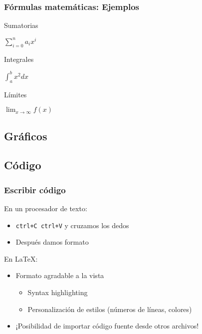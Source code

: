 \documentclass[svgnames]{beamer}
\begin{document}
\begin{frame}
  \frametitle{Fórmulas matemáticas: Ejemplos}
  Sumatorias
  {}
  \begin{center}
    $\sum_{i=0}^{n} a_ix^i$   
  \end{center}\pause
  Integrales
  {}
  \begin{center}
    $\int_{a}^{b} x^2 dx$   
  \end{center}\pause
  Límites
  {}
  \begin{center}
    $\lim_{x\to\infty} f(x)$  
  \end{center}\pause

\end{frame}

\subsection{Gráficos}

\begin{frame}
  \frametitle{}
\end{frame}


\subsection{Código}

\begin{frame}
  \frametitle{Escribir código}
  En un procesador de texto: 
  \begin{itemize}
    \item \texttt{ctrl+C ctrl+V} y cruzamos los dedos
    \item Después damos formato
  \end{itemize}\pause
  En \LaTeX:
  \begin{itemize}
    \item Formato agradable a la vista
    \begin{itemize}
      \item Syntax highlighting
      \item Personalización de estilos (números de líneas, colores)
    \end{itemize}
    \item ¡Posibilidad de importar código fuente desde otros archivos!
  \end{itemize}
\end{frame}
\end{document}
